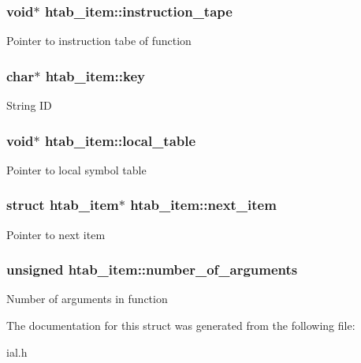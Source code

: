 \subsubsection[{\texorpdfstring{instruction\+\_\+tape}{instruction_tape}}]{\setlength{\rightskip}{0pt plus 5cm}void$\ast$ htab\+\_\+item\+::instruction\+\_\+tape}\hypertarget{structhtab__item_a88ce186940697b2875ed88bdaca2db12}{}\label{structhtab__item_a88ce186940697b2875ed88bdaca2db12}
Pointer to instruction tabe of function 
\subsubsection[{\texorpdfstring{key}{key}}]{\setlength{\rightskip}{0pt plus 5cm}char$\ast$ htab\+\_\+item\+::key}\hypertarget{structhtab__item_a66b265819081d3527ad1941f8bcb09d6}{}\label{structhtab__item_a66b265819081d3527ad1941f8bcb09d6}
String ID 
\subsubsection[{\texorpdfstring{local\+\_\+table}{local_table}}]{\setlength{\rightskip}{0pt plus 5cm}void$\ast$ htab\+\_\+item\+::local\+\_\+table}\hypertarget{structhtab__item_ab925f22b6d466d9d5c6e3099b79dfb58}{}\label{structhtab__item_ab925f22b6d466d9d5c6e3099b79dfb58}
Pointer to local symbol table 
\subsubsection[{\texorpdfstring{next\+\_\+item}{next_item}}]{\setlength{\rightskip}{0pt plus 5cm}struct {\bf htab\+\_\+item}$\ast$ htab\+\_\+item\+::next\+\_\+item}\hypertarget{structhtab__item_a8fe0d8f000c284334b0d939982239030}{}\label{structhtab__item_a8fe0d8f000c284334b0d939982239030}
Pointer to next item 
\subsubsection[{\texorpdfstring{number\+\_\+of\+\_\+arguments}{number_of_arguments}}]{\setlength{\rightskip}{0pt plus 5cm}unsigned htab\+\_\+item\+::number\+\_\+of\+\_\+arguments}\hypertarget{structhtab__item_a3f6b7b1fb06bd1a500375bd68a26685d}{}\label{structhtab__item_a3f6b7b1fb06bd1a500375bd68a26685d}
Number of arguments in function 

The documentation for this struct was generated from the following file\+:\begin{DoxyCompactItemize}
\item 
ial.\+h\end{DoxyCompactItemize}
